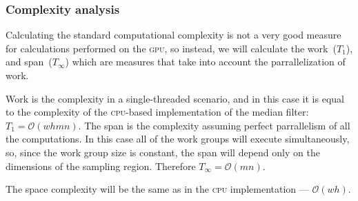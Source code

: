 \documentclass[12pt]{article}
\theoremstyle{definition}
\begin{document}
\subsubsection{Complexity analysis}

Calculating the standard computational complexity is not a very good measure for calculations performed on the \textsc{gpu},
so instead, we will calculate the work~($T_1$), and span~($T_\infty$) which are measures that take into account the parrallelization of work.

Work is the complexity in a single-threaded scenario, and in this case it is equal to the complexity of the \textsc{cpu}-based implementation of the median filter: $T_1 = \mathcal{O}(whmn)$.
The span is the complexity assuming perfect parrallelism of all the computations.
In this case all of the work groups will execute simultaneously, so, since the work group size is constant,
the span will depend only on the dimensions of the sampling region.
Therefore $T_\infty = \mathcal{O}(mn)$.

The space complexity will be the same as in the \textsc{cpu} implementation --- $\mathcal{O}(wh)$.
\end{document}
